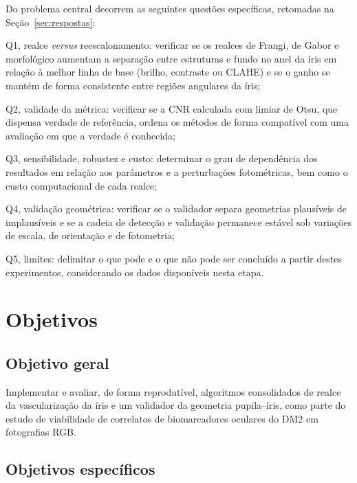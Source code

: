 \documentclass[12pt, oneside, a4paper, chapter=TITLE, section=TITLE,
               english, brazil]{abntex2}
\newcommand{\secao}[1]{\section[\texorpdfstring{\protect\MakeTextUppercase{#1}}{#1}]{#1}}
\begin{document}
Do problema central decorrem as seguintes questões específicas, retomadas na
Seção~\ref{sec:respostas}:
\begin{alineas}
  \item Q1, realce \emph{versus} reescalonamento: verificar se os realces de
  Frangi, de Gabor e morfológico aumentam a separação entre estruturas e
  fundo no anel da íris em relação à melhor linha de base (brilho, contraste
  ou CLAHE) e se o ganho se mantém de forma consistente entre regiões
  angulares da íris;
  \item Q2, validade da métrica: verificar se a CNR calculada com limiar de
  Otsu, que dispensa verdade de referência, ordena os métodos de forma
  compatível com uma avaliação em que a verdade é conhecida;
  \item Q3, sensibilidade, robustez e custo: determinar o grau de dependência
  dos resultados em relação aos parâmetros e a perturbações fotométricas, bem
  como o custo computacional de cada realce;
  \item Q4, validação geométrica: verificar se o validador separa geometrias
  plausíveis de implausíveis e se a cadeia de detecção e validação permanece
  estável sob variações de escala, de orientação e de fotometria;
  \item Q5, limites: delimitar o que pode e o que não pode ser concluído a
  partir destes experimentos, considerando os dados disponíveis nesta etapa.
\end{alineas}

\chapter{Objetivos}
\label{cap:objetivos}

\secao{Objetivo geral}

Implementar e avaliar, de forma reprodutível, algoritmos consolidados de
realce da vascularização da íris e um validador da geometria pupila--íris,
como parte do estudo de viabilidade de correlatos de biomarcadores oculares do
DM2 em fotografias RGB.

\secao{Objetivos específicos}
\end{document}
